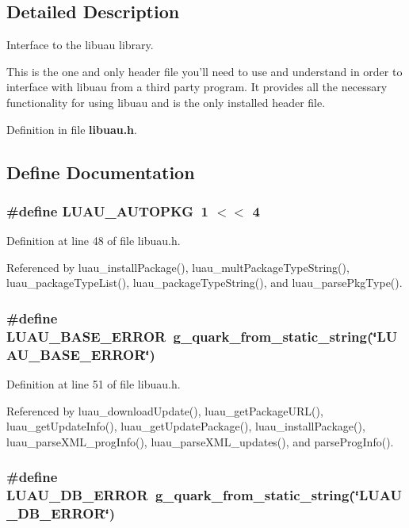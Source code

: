 \subsection{Detailed Description}
Interface to the libuau library. 

This is the one and only header file you'll need to use and understand in order to interface with libuau from a third party program. It provides all the necessary functionality for using libuau and is the only installed header file.

Definition in file {\bf libuau.h}.

\subsection{Define Documentation}
\subsubsection{\setlength{\rightskip}{0pt plus 5cm}\#define LUAU\_\-AUTOPKG\ 1 $<$$<$ 4}\label{libuau_8h_a10}




Definition at line 48 of file libuau.h.

Referenced by luau\_\-install\-Package(), luau\_\-mult\-Package\-Type\-String(), luau\_\-package\-Type\-List(), luau\_\-package\-Type\-String(), and luau\_\-parse\-Pkg\-Type().
\subsubsection{\setlength{\rightskip}{0pt plus 5cm}\#define LUAU\_\-BASE\_\-ERROR\ g\_\-quark\_\-from\_\-static\_\-string(\char`\"{}LUAU\_\-BASE\_\-ERROR\char`\"{})}\label{libuau_8h_a12}




Definition at line 51 of file libuau.h.

Referenced by luau\_\-download\-Update(), luau\_\-get\-Package\-URL(), luau\_\-get\-Update\-Info(), luau\_\-get\-Update\-Package(), luau\_\-install\-Package(), luau\_\-parse\-XML\_\-prog\-Info(), luau\_\-parse\-XML\_\-updates(), and parse\-Prog\-Info().
\subsubsection{\setlength{\rightskip}{0pt plus 5cm}\#define LUAU\_\-DB\_\-ERROR\ g\_\-quark\_\-from\_\-static\_\-string(\char`\"{}LUAU\_\-DB\_\-ERROR\char`\"{})}\label{libuau_8h_a16}




